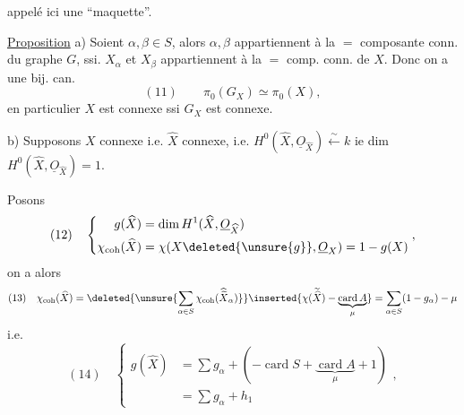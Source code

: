 appelé ici une ``maquette''.

\uline{Proposition} 
a) Soient $\alpha,\beta\in S$, alors $\alpha,\beta$ appartiennent à la $=$ composante conn. du graphe $G$, ssi. $X_\alpha$ et $X_\beta$ appartiennent à la $=$ comp. conn. de $X$. Donc  on a une bij. can.
\[
(11)\qquad\pi_0(G_X)\simeq\pi_0(X),
\]
en particulier $X$ est connexe ssi $G_X$ est connexe.

b) Supposons $X$ connexe i.e. $\widehat X$ connexe, i.e. $H^0(\widehat X,\underline O_{\widehat X})\xleftarrow{\sim}k$ ie dim $H^0(\widehat X,\underline O_{\widehat X})=1$.

Posons 
\[
(12)\quad\left\{\begin{aligned}
g(\widehat X)&=\dim H^1(\widehat X,\underline O_{\widehat X})\\
\chi_{\mathrm{coh}}(\widehat X)&=\chi(X\deleted{\unsure{g}},\underline O_X)=1-g(X)
\end{aligned}\right.,
\]
on a alors
\[
(13)\quad\chi_{\mathrm{coh}}(\widehat X)
=\deleted{\unsure{\sum_{\alpha\in S}\chi_{\mathrm{coh}}(\widehat{\widetilde X}_\alpha)}}
\inserted{\chi(\widetilde{\widehat X})-\underbrace{\operatorname{card}A}_{\mu}}
=\sum_{\alpha\in S}(1-g_\alpha)-\mu
\]
i.e.
\[
(14)\quad\left\{\begin{aligned}
g(\widehat X)&=\sum g_\alpha+(-\operatorname{card}S+\underbrace{\operatorname{card}A}_{\mu}+1)\\
&=\sum g_\alpha+h_1
\end{aligned}\right.,
\]
